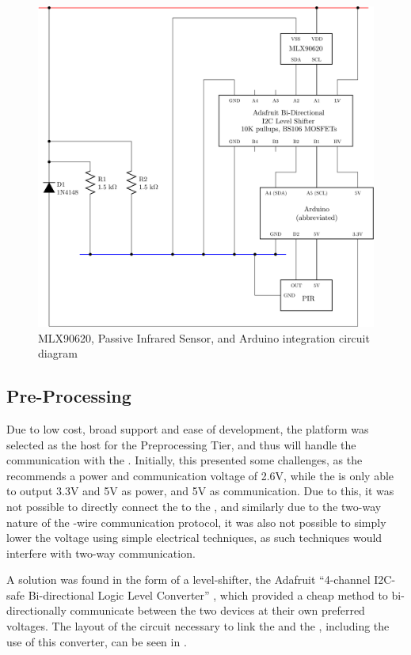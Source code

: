 \documentclass[../thesis/thesis.tex]{subfiles}
\begin{document}
\begin{figure}
\centering
\includegraphics[width=\textwidth]{../diagrams/mlx-arduino2.pdf}
\caption{MLX90620, Passive Infrared Sensor, and Arduino integration circuit diagram}
\label{fig:circuits:node}
\end{figure}

\subsection{Pre-Processing}

Due to low cost, broad support and ease of development, the \ard platform was selected as the host for the Preprocessing Tier, and thus will handle the \iic communication with the \mlx. Initially, this presented some challenges, as the \mlx recommends a power and communication voltage of 2.6V, while the \ard is only able to output 3.3V and 5V as power, and 5V as communication. Due to this, it was not possible to directly connect the \ard to the \mlx, and similarly due to the two-way nature of the -wire communication protocol, it was also not possible to simply lower the \ard voltage using simple electrical techniques, as such techniques would interfere with two-way communication.

A solution was found in the form of a \iic level-shifter, the Adafruit ``4-channel I2C-safe Bi-directional Logic Level Converter'' \cite{AdafruitI2C}, which provided a cheap method to bi-directionally communicate between the two devices at their own preferred voltages. The layout of the circuit necessary to link the \ard and the \mlx, including the use of this converter, can be seen in .
\end{document}
